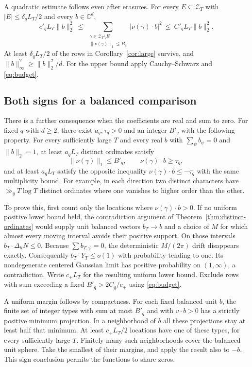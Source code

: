 \documentclass[11pt]{article}
\newcommand{\C}{\mathbb C}
\begin{document}
A quadratic estimate follows even after erasures. For every $E\subseteq\mathcal Z_T$ with $|E|\le\delta_q L_T/2$ and every $b\in\C^d$,
\begin{equation}\label{eq:frame}
 c'_q L_T\|b\|_2^2\ \le\
 \sum_{\substack{\gamma\in\mathcal Z_T\setminus E\\ \|\nu(\gamma)\|_1\le B_q}}
 |\nu(\gamma)\cdot b|^2\ \le\ C'_q L_T\|b\|_2^2 .
\end{equation}
At least $\delta_qL_T/2$ of the rows in Corollary~\ref{cor:large} survive, and $\|b\|_\infty^2\ge\|b\|_2^2/d$. For the upper bound apply Cauchy--Schwarz and \eqref{eq:budget}.

\subsection*{Both signs for a balanced comparison}
There is a further consequence when the coefficients are real and sum to zero. For fixed $q$ with $d\ge2$, there exist $a_q,\tau_q>0$ and an integer $B'_q$ with the following property. For every sufficiently large $T$ and every real $b$ with $\sum_\psi b_\psi=0$ and $\|b\|_2=1$, at least $a_qL_T$ distinct ordinates satisfy
\[
 \|\nu(\gamma)\|_1\le B'_q,\qquad \nu(\gamma)\cdot b\ge\tau_q ,
\]
and at least $a_qL_T$ satisfy the opposite inequality $\nu(\gamma)\cdot b\le-\tau_q$ with the same multiplicity bound. For example, in each direction two distinct characters have $\gg_q T\log T$ distinct ordinates where one vanishes to higher order than the other.

To prove this, first count only the locations where $\nu(\gamma)\cdot b>0$. If no uniform positive lower bound held, the contradiction argument of Theorem~\ref{thm:distinct-ordinates} would supply unit balanced vectors $b_T\to b$ and a choice of $M$ for which almost every moving interval avoids their positive support. On those intervals $b_T\cdot\Delta_hN\le0$. Because $\sum b_{T,\psi}=0$, the deterministic $M/(2\pi)$ drift disappears exactly. Consequently $b_T\cdot Y_T\le o(1)$ with probability tending to one. Its nondegenerate centered Gaussian limit has positive probability on $(1,\infty)$, a contradiction. Write $c_+L_T$ for the resulting uniform lower bound. Exclude rows with sum exceeding a fixed $B'_q>2C_q/c_+$ using \eqref{eq:budget}.

A uniform margin follows by compactness. For each fixed balanced unit $b$, the finite set of integer types with sum at most $B'_q$ and with $v\cdot b>0$ has a strictly positive minimum projection. In a neighborhood of $b$ all these projections stay at least half that minimum. At least $c_+L_T/2$ locations have one of these types, for every sufficiently large $T$. Finitely many such neighborhoods cover the balanced unit sphere. Take the smallest of their margins, and apply the result also to $-b$. This sign conclusion permits the functions to share zeros.
\end{document}
